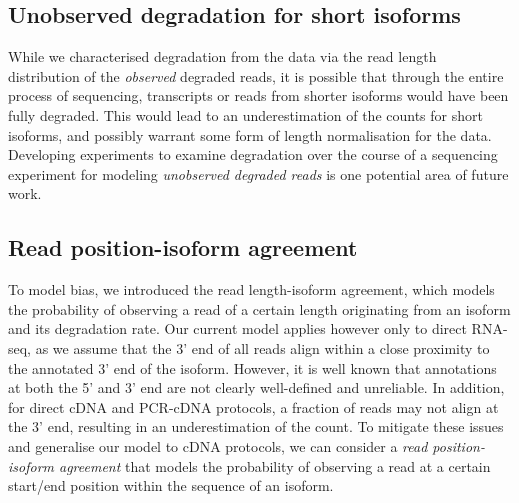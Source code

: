 \subsection{Unobserved degradation for short isoforms}

While we characterised degradation from the data via the read length distribution of the \textit{observed} degraded reads, it is possible that through the entire process of sequencing, transcripts or reads from shorter isoforms would have been fully degraded. This would lead to an underestimation of the counts for short isoforms, and possibly warrant some form of length normalisation for the data. Developing experiments to examine degradation over the course of a sequencing experiment for modeling \textit{unobserved degraded reads} is one potential area of future work.  

\subsection{Read position-isoform agreement}

To model bias, we introduced the read length-isoform agreement, which models the probability of observing a read of a certain length originating from an isoform and its degradation rate. Our current model applies however only to direct RNA-seq, as we assume that the 3' end of all reads align within a close proximity to the annotated 3' end of the isoform. However, it is well known that annotations at both the 5' and 3' end are not clearly well-defined and unreliable. In addition, for direct cDNA and PCR-cDNA protocols, a fraction of reads may not align at the 3' end, resulting in an underestimation of the count. To mitigate these issues and generalise our model to cDNA protocols, we can consider a \textit{read position-isoform agreement} that models the probability of observing a read at a certain start/end position within the sequence of an isoform. 


